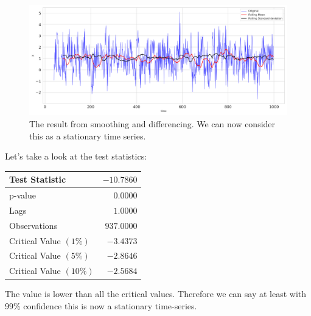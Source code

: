 \documentclass[]{article}
\begin{document}
\begin{itemize}
		\begin{figure}
			\centering
			\includegraphics[width=1\textwidth]{images/ts_log_moving_avg_diff.png}
			\caption{The result from smoothing and differencing. We can now consider this as a stationary time series.}
			\label{fig:rollingmean_diff}
		\end{figure}
		Let's take a look at the test statistics:
		\begin{center}
			\begin{tabular}{|l|r|}
				\hline Test Statistic & $-10.7860$ \\
				\hline p-value & $0.0000$ \\
				\hline Lags & $1.0000$ \\
				\hline Observations & $937.0000$ \\
				\hline Critical Value $(1 \%)$ & $-3.4373$ \\
				\hline Critical Value $(5 \%)$ & $-2.8646$ \\
				\hline Critical Value $(10 \%)$ & $-2.5684$ \\
				\hline
			\end{tabular}
		\end{center}
		The value is lower than all the critical values. Therefore we can say at least with 99\% confidence this is now a stationary time-series.
		


\end{itemize}
\end{document}
